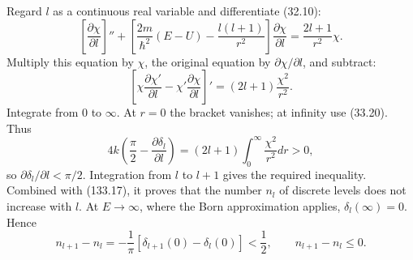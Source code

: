 \SolutionHeading Regard $l$ as a continuous real variable and differentiate (32.10):
\[
 \left[\frac{\partial\chi}{\partial l}\right]''+\left[\frac{2m}{\hbar^2}(E-U)-\frac{l(l+1)}{r^2}\right]\frac{\partial\chi}{\partial l}
 =\frac{2l+1}{r^2}\chi.
\]
Multiply this equation by $\chi$, the original equation by $\partial\chi/\partial l$, and subtract:
\[
 \left[\chi\frac{\partial\chi'}{\partial l}-\chi'\frac{\partial\chi}{\partial l}\right]'
 =(2l+1)\frac{\chi^2}{r^2}.
\]
Integrate from 0 to $\infty$. At $r=0$ the bracket vanishes; at infinity use (33.20). Thus
\[
 4k\left(\frac\pi2-\frac{\partial\delta_l}{\partial l}\right)
 =(2l+1)\int_0^\infty\frac{\chi^2}{r^2}dr>0,
\]
so $\partial\delta_l/\partial l<\pi/2$. Integration from $l$ to $l+1$ gives the required inequality. Combined with (133.17), it proves that the number $n_l$ of discrete levels does not increase with $l$. At $E\to\infty$, where the Born approximation applies, $\delta_l(\infty)=0$. Hence
\[
 n_{l+1}-n_l=-\frac1\pi[\delta_{l+1}(0)-\delta_l(0)]<\frac12,
 \qquad n_{l+1}-n_l\le0.
\]
